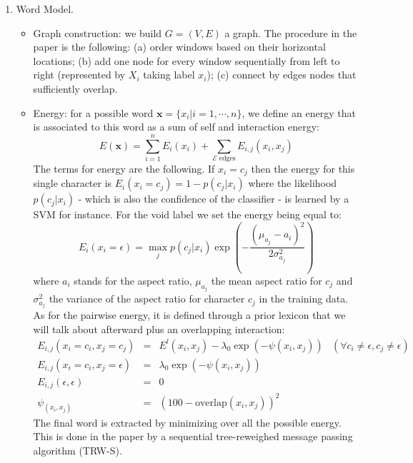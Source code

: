 \documentclass[10pt]{article}
\begin{document}
\begin{enumerate}
\item Word Model. 
\begin{itemize}
	\item Graph construction: we build $G = (V,E)$ a graph. The procedure in the paper is the following: (a) order windows based on their horizontal locations; (b) add one node for every window sequentially from left to right (represented by $X_i$ taking label $x_i$); (c) connect by edges nodes that sufficiently overlap.
	
	\item Energy: for a possible word $\mathbf{x} = \{ x_i | i=1,\cdots, n \}$, we define an energy that is associated to this word as a sum of self and interaction energy: 
	\begin{equation}
	E(\mathbf{x}) = \sum_{i=1}^n E_i(x_i) + \sum_{\mathcal{E} \text{ edges}} E_{i,j}(x_i,x_j)
	\label{eq:energy}
	\end{equation}
	The terms for energy are the following. If $x_i = c_j$ then the energy for this single character is $E_i(x_i = c_j) = 1 - p(c_j | x_i)$ where the likelihood $p(c_j | x_i)$ - which is also the confidence of the classifier - is learned by a SVM for instance. For the void label we set the energy being equal to: 
	\begin{equation}
	E_i(x_i = \epsilon) = \max_j p(c_j |x_i) \exp\left( - \frac{(\mu_{a_j} - a_i)^2}{2\sigma^2_{a_j}} \right)
	\label{eq:voidEnergy}
	\end{equation}
	where $a_i$ stands for the aspect ratio, $\mu_{a_j}$ the mean aspect ratio for $c_j$ and $\sigma_{a_j}^2$ the variance of the aspect ratio for character $c_j$ in the training data. As for the pairwise energy, it is defined through a prior lexicon that we will talk about afterward plus an overlapping interaction:
	\begin{equation}
	\begin{array}{rlll}
	E_{i,j}(x_i = c_i,x_j = c_j) 			& = & E^l(x_i,x_j) - \lambda_0\exp\left( - \psi(x_i,x_j) \right) 	& (\forall c_i \neq \epsilon, c_j \neq \epsilon) \\
	E_{i,j}(x_i = c_i,x_j = \epsilon) & = & \lambda_0\exp\left( - \psi(x_i,x_j) \right) 								& \\
	E_{i,j}(\epsilon, \epsilon) 			& = & 0 																													& \\
	\psi_(x_i,x_j) 										& = & (100 - \text{overlap}(x_i,x_j))^2 													&
	\end{array}
	\label{eq:pairwiseEnergy}
	\end{equation}
	The final word is extracted by minimizing over all the possible energy. This is done in the paper by a sequential tree-reweighed message passing algorithm (TRW-S).
\end{itemize}


\end{enumerate}
\end{document}
